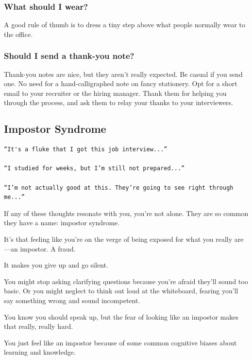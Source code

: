 \documentclass{article}
\begin{document}
\subsubsection{What should I wear?}

A good rule of thumb is to dress a tiny step above what people normally wear to the office.

\subsubsection{Should I send a thank-you note?}

Thank-you notes are nice, but they aren’t really expected. Be casual if you send one. No need for a hand-calligraphed note on fancy stationery. Opt for a short email to your recruiter or the hiring manager. Thank them for helping you through the process, and ask them to relay your thanks to your interviewers.


\subsection{Impostor Syndrome}

\begin{verbatim}
“It's a fluke that I got this job interview...”

“I studied for weeks, but I’m still not prepared...”

“I’m not actually good at this. They’re going to see right through me...”
\end{verbatim}

If any of these thoughts resonate with you, you're not alone. They are so common they have a name: impostor syndrome.

It’s that feeling like you’re on the verge of being exposed for what you really are—an impostor. A fraud.

 It makes you give up and go silent.

You might stop asking clarifying questions because you’re afraid they’ll sound too basic. Or you might neglect to think out loud at the whiteboard, fearing you’ll say something wrong and sound incompetent.

You know you should speak up, but the fear of looking like an impostor makes that really, really hard.

 You just feel like an impostor because of some common cognitive biases about learning and knowledge.
\end{document}
